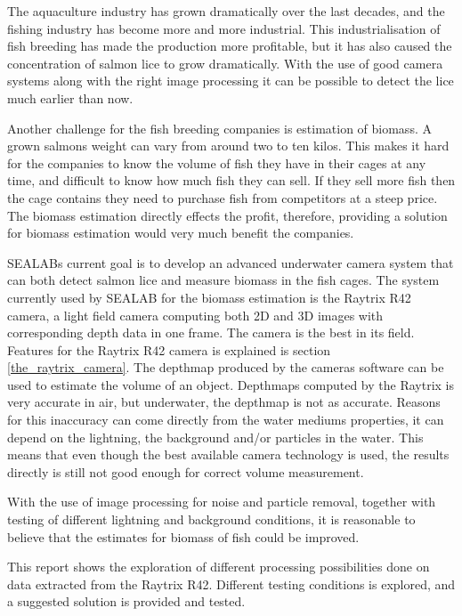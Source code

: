 The aquaculture industry has grown dramatically over the last decades, and the fishing industry has become more and more industrial. This industrialisation of fish breeding has made the production more profitable, but it has also caused the concentration of salmon lice to grow dramatically. With the use of good camera systems along with the right image processing it can be possible to detect the lice much earlier than now. 

Another challenge for the fish breeding companies is estimation of biomass. A grown salmons weight can vary from around two to ten kilos. This makes it hard for the companies to know the volume of fish they have in their cages at any time, and difficult to know how much fish they can sell. If they sell more fish then the cage contains they need to purchase fish from competitors at a steep price. The biomass estimation directly effects the profit, therefore, providing a solution for biomass estimation would very much benefit the companies. 

SEALABs current goal is to develop an advanced underwater camera system that can both detect salmon lice and measure biomass in the fish cages.
The system currently used by SEALAB for the biomass estimation is the Raytrix R42 camera, a light field camera computing both 2D and 3D images with corresponding depth data in one frame. The camera is the best in its field. Features for the Raytrix R42 camera is explained is section \ref{the_raytrix_camera}. 
The depthmap produced by the cameras software can be used to estimate the volume of an object. Depthmaps computed by the Raytrix is very accurate in air, but underwater, the depthmap is not as accurate. Reasons for this inaccuracy can come directly from the water mediums properties, it can depend on the lightning, the background and/or particles in the water. This means that even though the best available camera technology is used, the results directly is still not good enough for correct volume measurement.

With the use of image processing for noise and particle removal, together with testing of different lightning and background conditions, it is reasonable to believe that the estimates for biomass of fish could be improved.

This report shows the exploration of different processing possibilities done on data extracted from the Raytrix R42. Different testing conditions is explored, and a suggested solution is provided and tested.